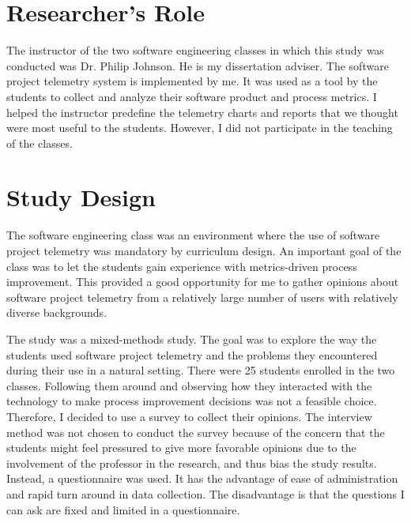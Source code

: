 
\section{Researcher's Role} \label{EvaluationInClassroom:Role}

The instructor of the two software engineering classes in which this study was conducted was Dr. Philip Johnson. He is my dissertation adviser. The software project telemetry system is implemented by me. It was used as a tool by the students to collect and analyze their software product and process metrics. I helped the instructor predefine the telemetry charts and reports that we thought were most useful to the students. However, I did not participate in the teaching of the classes.






\section{Study Design} \label{EvaluationInClassroom:StudyDesign}

The software engineering class was an environment where the use of software project telemetry was mandatory by curriculum design. An important goal of the class was to let the students gain experience with metrics-driven process improvement. This provided a good opportunity for me to gather opinions about software project telemetry from a relatively large number of users with relatively diverse backgrounds.

The study was a mixed-methods study. The goal was to explore the way the students used software project telemetry and the problems they encountered during their use in a natural setting. There were 25 students enrolled in the two classes. Following them around and observing how they interacted with the technology to make process improvement decisions was not a feasible choice. Therefore, I decided to use a survey to collect their opinions. The interview method was not chosen to conduct the survey because of the concern that the students might feel pressured to give more favorable opinions due to the involvement of the professor in the research, and thus bias the study results. Instead, a questionnaire was used. It has the advantage of ease of administration and rapid turn around in data collection. The disadvantage is that the questions I can ask are fixed and limited in a questionnaire.

